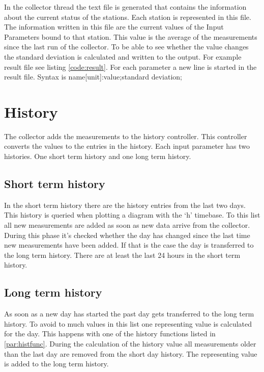 In the collector thread the text file is generated that contains the information about the current status of the stations. Each station is represented in this file. The information written in this file are the current values of the Input Parameters bound to that station. This value is the average of the measurements since the last run of the collector. To be able to see whether the value changes the standard deviation is calculated and written to the output. For example result file see listing \ref{code:result}. 
For each parameter a new line is started in the result file. Syntax is {\C name[unit]:value;standard deviation;}

{\C  }


\section{History} %
\label{sec:history}
The collector adds the measurements to the history controller. This controller converts the values to the entries in the history. Each input parameter has two histories. One short term history and one long term history. 
\subsection{Short term history} %
\label{sub:short_term_history}
In the short term history there are the history entries from the last two days. This history is queried when plotting a diagram with the `h' timebase. To this list all new measurements are added as soon as new data arrive from the collector. During this phase it's checked whether the day has changed since the last time new measurements have been added. If that is the case the day is transferred to the long term history. There are at least the last 24 hours in the short term history.

\subsection{Long term history} %
\label{ssub:long_term_history}
As soon as a new day has started the past day gets transferred to the long term history. To avoid to much values in this list one representing value is calculated for the day. This happens with one of the history functions listed in \ref{par:histfunc}. During the calculation of the history value all measurements older than the last day are removed from the short day history. The representing value is added to the long term history.

